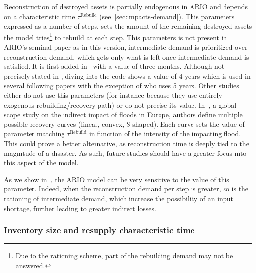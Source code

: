 Reconstruction of destroyed assets is partially endogenous in ARIO and depends
on a characteristic time $\tau^{\textrm{Rebuild}}$ (see~\cref{sec:impacts-demand}). This parameters expressed as
a number of steps, sets the amount of the remaining destroyed assets the model
tries\footnote{Due to the rationing scheme, part of the rebuilding demand may
  not be answered.} to rebuild at each step. This parameters is not present in
ARIO's seminal paper \parencite{hallegatte-2008-adapt-region} as
in this version, intermediate demand is prioritized over reconstruction demand,
which gets only what is left once intermediate demand is satisfied. It is first
added in~\textcite{ranger-2010-asses-poten} with a value of three
months. Although not precisely stated in
\textcite{hallegatte-2013-model-role}, diving into the code shows a
value of 4 years which is used in several following papers
\parencite{zhang-2018-analy-econom, koks-2014-integ-direc} with the exception of
\textcite{avelino-2019-chall-estim} who uses 5 years. Other studies
either do not use this parameters (for instance because they use entirely
exogenous rebuilding/recovery path) or do not precise its value.
In~\textcite{koks-2019-macroec-impac}, a global scope study on
the indirect impact of floods in Europe, authors define multiple possible
recovery curves (linear, convex, S-shaped).
Each curve sets the value of parameter matching $\tau^{\textrm{Rebuild}}$ in
function of the intensity of the impacting flood. This could prove a better
alternative, as reconstruction time is deeply tied to the magnitude of a
disaster. As such, future studies should have a greater focus into this aspect
of the model.

As we show in~, the ARIO model can be very
sensitive to the value of this parameter. Indeed, when the reconstruction demand
per step is greater, so is the rationing of intermediate demand, which increase
the possibility of an input shortage, further leading to greater indirect
losses.


\subsubsection{Inventory size and resupply characteristic time}
\label{sec:inventories-params}

